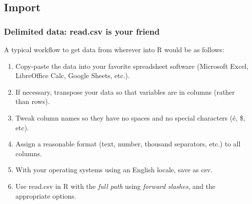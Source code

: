 \documentclass{report}
\newcommand{\code}[1]{\textsf{\ttfamily #1}}
\begin{document}
		\subsection{Import}\label{subsec:import}
		\subsubsection{Delimited data: \code{read.csv} is your friend}
		A typical workflow to get data from wherever into R would be as follows:
		\begin{enumerate}
			\item Copy-paste the data into your favorite spreadsheet software (Microsoft Excel, LibreOffice Calc, Google Sheets, etc.).
			\item If necessary, transpose your data so that variables are in columns (rather than rows).
			\item Tweak column names so they have no spaces and no special characters (é, \$, etc).
			\item Assign a reasonable format (text, number, thousand separators, etc.) to all columns.
			\item With your operating systems using an English locale, save as csv.
			\item Use \code{read.csv} in R with the \emph{full path} using \emph{forward slashes}, and the appropriate options.
		\end{enumerate}
	
\end{document}
